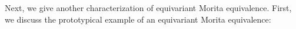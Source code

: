 \documentclass[reqno]{amsart}
\numberwithin{equation}{section}
\newcommand{\G}{\mathbb{G}}
\newcommand{\ovot}{\bar{\otimes}}
\begin{document}
Next, we give another characterization of equivariant Morita equivalence.  First, we discuss the prototypical example of an equivariant Morita equivalence:
\end{document}
